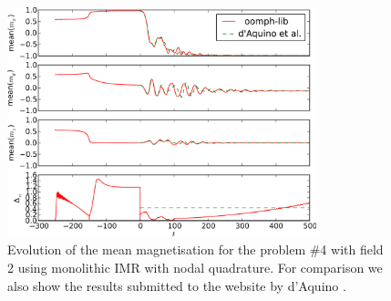\begin{figure}
  \centering
  \includegraphics[width=0.8\textwidth]{plots/mumag4_convergence/mumag4_field2-meanmxsvs-meanmysvs-meanmzsvs-dtsvstimes.pdf}
  \caption{
    Evolution of the mean magnetisation for the \mumag problem \#4 with field 2 using monolithic IMR with nodal quadrature.
    For comparison we also show the results submitted to the \mumag website by d'Aquino \etal \cite{mumag-website}.
  }
  \label{fig:nmag-comparison-mumag4-field2}
\end{figure}


%



